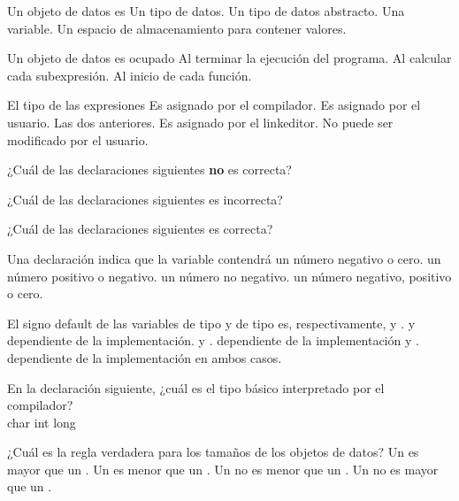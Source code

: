 \begin{preguntas}
\question Un objeto de datos es
\choice Un tipo de datos.
\choice Un tipo de datos abstracto.
\choice Una variable.
\correctchoice Un espacio de almacenamiento para contener valores.

\question Un objeto de datos es ocupado
\choice Al terminar la ejecución del programa.
\correctchoice Al calcular cada subexpresión.
\choice Al inicio de cada función.

\question El tipo de las expresiones
\choice Es asignado por el compilador.
\choice Es asignado por el usuario.
\correctchoice Las dos anteriores.
\choice Es asignado por el linkeditor.
\choice No puede ser modificado por el usuario.

\question ¿Cuál de las declaraciones siguientes \textbf{no} es correcta?
\choice {}
\choice {}
\correctchoice {}
\choice {}
\choice {}

\question ¿Cuál de las declaraciones siguientes es incorrecta?
\choice {}
\choice {}
\correctchoice {}
\choice {}

\question ¿Cuál de las declaraciones siguientes es correcta?
\correctchoice {}
\choice {}
\choice {}
\choice {}

\question Una declaración  indica que la variable contendrá
\choice un número negativo o cero.
\choice un número positivo o negativo.
\choice un número no negativo.
\correctchoice un número negativo, positivo o cero.

\question El signo default de las variables de tipo  y de tipo  es, respectivamente,
\choice {} y .
\correctchoice {} y dependiente de la implementación.
\choice {} y .
\choice dependiente de la implementación y .
\choice dependiente de la implementación en ambos casos.

\question En la declaración siguiente, ¿cuál es el tipo básico interpretado por el compilador? \\
\choice char
\correctchoice int
\choice long

\question ¿Cuál es la regla verdadera para los tamaños de los objetos de datos?
\choice Un  es mayor que un .
\choice Un  es menor que un .
\choice Un  no es menor que un .
\correctchoice Un  no es mayor que un .


\end{preguntas}
